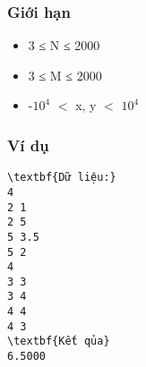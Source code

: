 \subsubsection{   Giới hạn  }
\begin{itemize}
	\item     3 ≤ N ≤ 2000   
	\item     3 ≤ M ≤ 2000   
	\item     -$10^{4}$    $<$ x, y $<$ $10^{4}$
\end{itemize}

\subsubsection{   Ví dụ  }
\begin{verbatim}
\textbf{Dữ liệu:}
4
2 1 
2 5  
5 3.5  
5 2
4
3 3 
3 4 
4 4 
4 3  
\textbf{Kết qủa}
6.5000
\end{verbatim}
